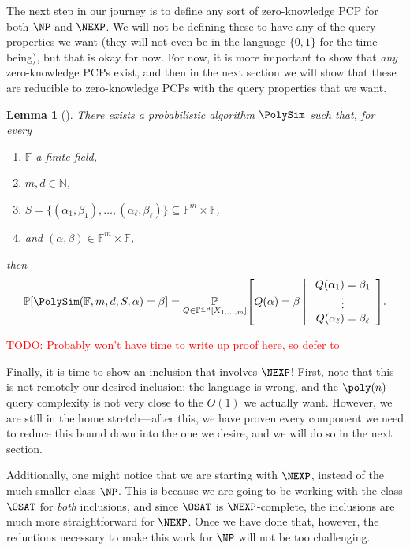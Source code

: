 \documentclass[english,12pt]{reedthesis}
\theoremstyle{plain}
\newtheorem{lemma}[lemma]{Lemma}
\theoremstyle{definition}
\theoremstyle{remark}
\newcommand{\middlemid}{%
  \ensuremath{\;\middle\vert\;}
}
\newcommand{\TODO}[1]{\textcolor{red}{TODO: #1}}
\begin{document}
The next step in our journey is to define any sort of zero-knowledge PCP for
both $\NP$ and $\NEXP$. We will not be defining these to have any of the query
properties we want (they will not even be in the language $\{0, 1\}$ for the
time being), but that is okay for now. For now, it is more important to show
that \emph{any} zero-knowledge PCPs exist, and then in the next section we will
show that these are reducible to zero-knowledge PCPs with the query properties
that we want.

\begin{lemma}[{\cite[Corollary 4.10]{BCFGRS17}}]\label{lem:polysim}
  There exists a probabilistic algorithm $\PolySim$ such that, for every
  \begin{enumerate}
    \item $\mathbb{F}$ a finite field,
    \item $m, d \in \mathbb{N}$,
    \item $S = \{(\alpha_{1}, \beta_{1}), \ldots, (\alpha_{\ell}, \beta_{\ell})\} \subseteq \mathbb{F}^{m} \times \mathbb{F}$,
    \item and $(\alpha, \beta) \in \mathbb{F}^{m} \times \mathbb{F}$,
  \end{enumerate}
  then
  \begin{equation}
    \mathbb{P}\mleft[\PolySim(\mathbb{F}, m, d, S, \alpha) = \beta\mright]
    = \underset{Q \in \mathbb{F}^{\le d}[X_{1, \ldots, m}]}{\mathbb{P}}\mleft[
      Q(\alpha) = \beta \middlemid
      \begin{array}{c}
        Q(\alpha_{1}) = \beta_{1} \\
        \vdots \\
        Q(\alpha_{\ell}) = \beta_{\ell}
      \end{array}
    \mright].
  \end{equation}
\end{lemma}

\TODO{Probably won't have time to write up proof here, so defer to
  \cite{BCFGRS17}}

Finally, it is time to show an inclusion that involves $\NEXP$! First, note that
this is not remotely our desired inclusion: the language is wrong, and the
$\poly(n)$ query complexity is not very close to the $O(1)$ we actually want.
However, we are still in the home stretch---after this, we have proven every
component we need to reduce this bound down into the one we desire, and we will
do so in the next section.

Additionally, one might notice that we are starting with $\NEXP$, instead of the
much smaller class $\NP$. This is because we are going to be working with the
class $\OSAT$ for \emph{both} inclusions, and since $\OSAT$ is $\NEXP$-complete,
the inclusions are much more straightforward for $\NEXP$. Once we have done
that, however, the reductions necessary to make this work for $\NP$ will not
be too challenging.
\end{document}
